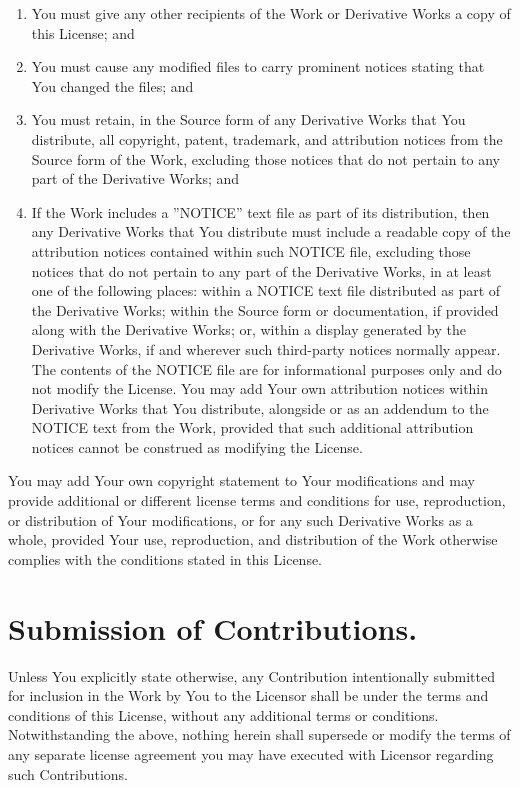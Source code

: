 \documentclass[a4paper, 12pt]{article}
\begin{document}
\begin{enumerate}[label=(\alph*)]
\item You must give any other recipients of the Work or Derivative Works a copy of this License; and
\item You must cause any modified files to carry prominent notices stating that You changed the files; and
\item You must retain, in the Source form of any Derivative Works that You distribute, all copyright, patent, trademark, and attribution notices from the Source form of the Work, excluding those notices that do not pertain to any part of the Derivative Works; and
\item If the Work includes a ''NOTICE'' text file as part of its distribution, then any Derivative Works that You distribute must include a readable copy of the attribution notices contained within such NOTICE file, excluding those notices that do not pertain to any part of the Derivative Works, in at least one of the following places: within a NOTICE text file distributed as part of the Derivative Works; within the Source form or documentation, if provided along with the Derivative Works; or, within a display generated by the Derivative Works, if and wherever such third-party notices normally appear. The contents of the NOTICE file are for informational purposes only and do not modify the License. You may add Your own attribution notices within Derivative Works that You distribute, alongside or as an addendum to the NOTICE text from the Work, provided that such additional attribution notices cannot be construed as modifying the License.
\end{enumerate}

\vspace{0.3cm}

You may add Your own copyright statement to Your modifications and may provide additional or different license terms and conditions for use, reproduction, or distribution of Your modifications, or for any such Derivative Works as a whole, provided Your use, reproduction, and distribution of the Work otherwise complies with the conditions stated in this License.

\section{Submission of Contributions.}

Unless You explicitly state otherwise, any Contribution intentionally submitted for inclusion in the Work by You to the Licensor shall be under the terms and conditions of this License, without any additional terms or conditions. Notwithstanding the above, nothing herein shall supersede or modify the terms of any separate license agreement you may have executed with Licensor regarding such Contributions.
\end{document}
